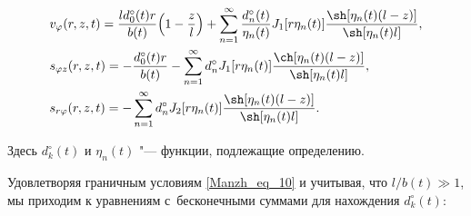 \begin{equation}\label{Manzh_eq_11}%

\begin{aligned}

  &

  v_\varphi(r,z,t)=\frac{ld_0^\circ(t)r}{b(t)}\Bigl(1-\frac zl\Bigr)

  +\sum_{n=1}^\infty\frac{d_n^\circ(t)}{\eta_n(t)}J_1[r\eta_n(t)]

  \frac{\sh[\eta_n(t)(l-z)]}{\sh[\eta_n(t)l]},

\\

  &

  s_{\varphi z}(r,z,t)=-\frac{d_0^\circ(t)r}{b(t)}

  -\sum_{n=1}^\infty d_n^\circ J_1[r\eta_n(t)]\frac{\ch[\eta_n(t)(l-z)]}{\sh[\eta_n(t)l]},

\\

  &

  s_{r\varphi}(r,z,t)=

  -\sum_{n=1}^\infty d_n^\circ J_2[r\eta_n(t)]\frac{\sh[\eta_n(t)(l-z)]}{\sh[\eta_n(t)l]}.

\end{aligned}

\end{equation}

Здесь $d_k^\circ(t)$ и $\eta_n(t)$ "--- функции, подлежащие определению.



Удовлетворяя граничным условиям \eqref{Manzh_eq_10} и учитывая, что $l/b(t)\gg1$, мы приходим к уравнениям с~бесконечными суммами для нахождения $d_k^\circ(t)$:

